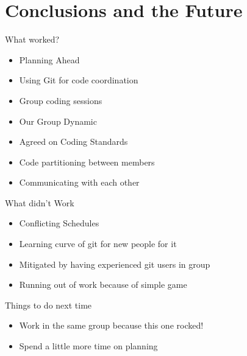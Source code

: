 \documentclass[compress, blue]{beamer}
\begin{document}
\section{Conclusions and the Future}

\begin{frame}{What worked?}

	\begin{itemize}
		\item Planning Ahead
		\item Using Git for code coordination
		\item Group coding sessions
		\item Our Group Dynamic
		\item Agreed on Coding Standards
		\item Code partitioning between members
		\item Communicating with each other
	\end{itemize}

\end{frame}

\begin{frame}{What didn't Work}

	\begin{itemize}
		\item Conflicting Schedules
		\item Learning curve of git for new people for it
		\item Mitigated by having experienced git users in group
		\item Running out of work because of simple game 
	\end{itemize}

\end{frame}
 
\begin{frame}{Things to do next time}

	\begin{itemize}
		\item Work in the same group because this one rocked!
		\item Spend a little more time on planning 
	\end{itemize}

\end{frame}
\end{document}
